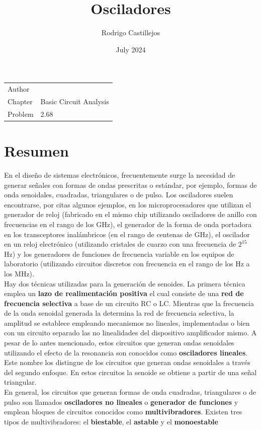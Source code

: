 \documentclass{article}
\title{Osciladores}
\author{Rodrigo Castillejos}
\date{July 2024}
\begin{document}
	
	\maketitle
	
	\noindent\begin{tabular}{@{}ll}
		Author & \theauthor\\
		Chapter &  Basic Circuit Analysis\\
		Problem & 2.68
	\end{tabular}
	
	\section*{Resumen}
En el diseño de sistemas electrónicos, frecuentemente surge la necesidad de generar señales con formas de ondas prescritas o estándar, por ejemplo, formas de onda senoidales, cuadradas, triangulares o de pulso. Los osciladores suelen encontrarse, por citas algunos ejemplos, en los microprocesadores que utilizan el generador de reloj (fabricado en el mismo chip utilizando osciladores de anillo con frecuencias en el rango de los GHz), el generador de la forma de onda portadora en los transceptores inalámbricos (en el rango de centenas de GHz), el oscilador en un reloj electrónico (utilizando cristales de cuarzo con una frecuencia de $2^{15}$ Hz) y los generadores de funciones de frecuencia variable en los equipos de laboratorio (utilizando circuitos discretos con frecuencia en el rango de los Hz a los MHz). \\

\noindent Hay dos técnicas utilizadas para la generación de senoides. La primera técnica emplea un \textbf{lazo de realimentación positiva} el cual consiste de una \textbf{red de frecuencia selectiva} a base de un circuito RC o LC. Mientras que la frecuencia de la onda senoidal generada la determina la red de frecuencia selectiva, la amplitud se establece empleando mecanismos no lineales, implementadas o bien con un circuito separado las no linealidades del dispositivo amplificador mismo. A pesar de lo antes mencionado, estos circuitos que generan ondas senoidales utilizando el efecto de la resonancia son conocidos como \textbf{osciladores lineales}. Este nombre los distingue de los circuitos que generan ondas senoidales a través del segundo enfoque. En estos circuitos la senoide se obtiene a partir de una señal triangular.\\

\noindent En general, los circuitos que generan formas de onda cuadradas, triangulares o de pulso son llamados \textbf{osciladores no lineales} o \textbf{generador de funciones} y emplean bloques de circuitos conocidos como \textbf{multivibradores}. Existen tres tipos de multivibradores: el \textbf{biestable}, el \textbf{astable} y el \textbf{monoestable}
\end{document}
